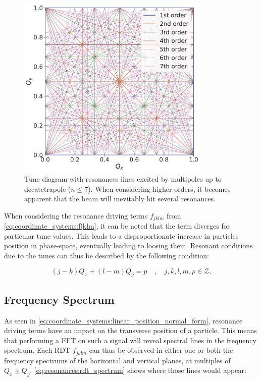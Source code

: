 \begin{figure}[H]
    \centering
    \includegraphics[width=0.82\textwidth]{images/resonance_diagram_n7.pdf}
    \caption{Tune diagram with resonances lines excited by multipoles up to decatetrapole 
             ($n \leq 7$). When considering higher orders, it becomes apparent that the beam will
             inevitably hit several resonances.}
    \label{fig:resonances:diagram_n7}
\end{figure}


When considering the resonance driving terms $f_{jklm}$ from \cref{eq:coordinate_systems:fjklm}, it
can be noted that the term diverges for particular tune values. This leads to a disproportionate
increase in particles position in phase-space, eventually leading to loosing them.
Resonant conditions due to the tunes can thus be described by the following condition:

\begin{equation}
    (j-k)Q_x + (l-m)Q_y = p \quad,\quad j,k,l,m,p \in \mathcal{Z}.
\end{equation}
    


\subsection{Frequency Spectrum}

As seen in \cref{eq:coordinate_systems:linear_position_normal_form}, resonance driving terms have an
impact on the transverse position of a particle. This means that performing a FFT on such a signal
will reveal spectral lines in the frequency spectrum.
Each RDT $f_{jklm}$ can thus be observed in either one or both the frequency spectrums of the
horizontal and vertical planes, at multiples of $Q_x \pm Q_y$. \cref{eq:resonances:rdt_spectrum}
shows where those lines would appear:


